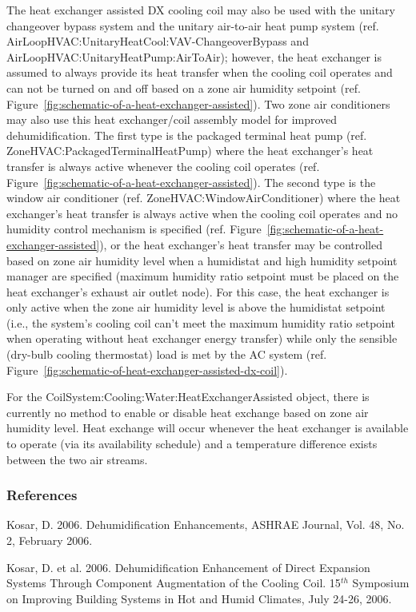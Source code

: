 The heat exchanger assisted DX cooling coil may also be used with the unitary changeover bypass system and the unitary air-to-air heat pump system (ref. AirLoopHVAC:UnitaryHeatCool:VAV-ChangeoverBypass and AirLoopHVAC:UnitaryHeatPump:AirToAir); however, the heat exchanger is assumed to always provide its heat transfer when the cooling coil operates and can not be turned on and off based on a zone air humidity setpoint (ref. Figure~\ref{fig:schematic-of-a-heat-exchanger-assisted}). Two zone air conditioners may also use this heat exchanger/coil assembly model for improved dehumidification. The first type is the packaged terminal heat pump (ref. ZoneHVAC:PackagedTerminalHeatPump) where the heat exchanger's heat transfer is always active whenever the cooling coil operates (ref. Figure~\ref{fig:schematic-of-a-heat-exchanger-assisted}). The second type is the window air conditioner (ref. ZoneHVAC:WindowAirConditioner) where the heat exchanger's heat transfer is always active when the cooling coil operates and no humidity control mechanism is specified (ref. Figure~\ref{fig:schematic-of-a-heat-exchanger-assisted}), or the heat exchanger's heat transfer may be controlled based on zone air humidity level when a humidistat and high humidity setpoint manager are specified (maximum humidity ratio setpoint must be placed on the heat exchanger's exhaust air outlet node). For this case, the heat exchanger is only active when the zone air humidity level is above the humidistat setpoint (i.e., the system's cooling coil can't meet the maximum humidity ratio setpoint when operating without heat exchanger energy transfer) while only the sensible (dry-bulb cooling thermostat) load is met by the AC system (ref. Figure~\ref{fig:schematic-of-heat-exchanger-assisted-dx-coil}).

For the CoilSystem:Cooling:Water:HeatExchangerAssisted object, there is currently no method to enable or disable heat exchange based on zone air humidity level. Heat exchange will occur whenever the heat exchanger is available to operate (via its availability schedule) and a temperature difference exists between the two air streams.

\subsubsection{References}\label{references-8}

Kosar, D. 2006. Dehumidification Enhancements, ASHRAE Journal, Vol. 48, No. 2, February 2006.

Kosar, D. et al. 2006. Dehumidification Enhancement of Direct Expansion Systems Through Component Augmentation of the Cooling Coil. 15\(^{th}\) Symposium on Improving Building Systems in Hot and Humid Climates, July 24-26, 2006.

